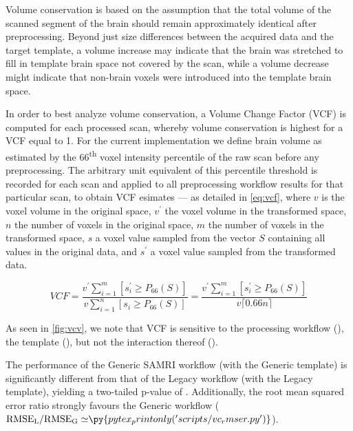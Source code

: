 Volume conservation is based on the assumption that the total volume of the scanned segment of the brain should remain approximately identical after preprocessing.
Beyond just size differences between the acquired data and the target template, a volume increase may indicate that the brain was stretched to fill in template brain space not covered by the scan, while a volume decrease might indicate that non-brain voxels were introduced into the template brain space.

In order to best analyze volume conservation, a Volume Change Factor (VCF) is computed for each processed scan, whereby volume conservation is highest for a VCF equal to 1.
For the current implementation we define brain volume as estimated by the 66\textsuperscript{th} voxel intensity percentile of the raw scan before any preprocessing.
The arbitrary unit equivalent of this percentile threshold is recorded for each scan and applied to all preprocessing workflow results for that particular scan, to obtain VCF esimates
 --- as detailed in \cref{eq:vcf}, where $v$ is the voxel volume in the original space, $v^\prime$ the voxel volume in the transformed space, $n$ the number of voxels in the original space, $m$ the number of voxels in the transformed space, $s$ a voxel value sampled from the vector $S$ containing all values in the original data, and $s^\prime$ a voxel value sampled from the transformed data.

\begin{equation} \label{eq:vcf}
        V\!C\!F
        = \frac{v^\prime\sum_{i=1}^m [s^\prime_i \geq P_{66}(S)]}{v\sum_{i=1}^n [s_i \geq P_{66}(S)]}
        = \frac{v^\prime\sum_{i=1}^m [s^\prime_i \geq P_{66}(S)]}{v \lceil0.66n\rceil}
\end{equation}

As seen in \cref{fig:vcv}, we note that VCF is sensitive to
the processing workflow (),
the template (),
but not the interaction thereof ().

The performance of the Generic SAMRI workflow (with the Generic template) is significantly different from that of the Legacy workflow (with the Legacy template), yielding a two-tailed p-value of .
Additionally, the root mean squared error ratio strongly favours the Generic workflow
($\mathrm{RMSE_{L}/RMSE_{G}\simeq} \py{pytex_printonly('scripts/vc_rmser.py')}$).

